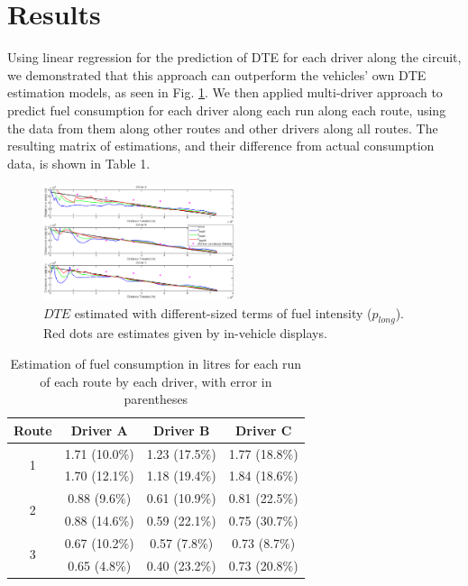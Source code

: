 \section{Results}

Using linear regression for the prediction of DTE for each driver along the circuit, we demonstrated that this approach can outperform the vehicles' own DTE estimation models, as seen in Fig. \ref{fig:dte}. 
We then applied multi-driver approach to predict fuel consumption for each driver along each run along each route, using the data from them along other routes and other drivers along all routes. The resulting matrix of estimations, and their difference from actual consumption data, is shown in Table 1.

\begin{figure}[!htb]
\centering
    \includegraphics[width=0.5\textwidth]{figs/acmdte}
\caption{\(DTE\) estimated with different-sized terms of fuel intensity (\(p_{long}\)). Red dots are estimates given by in-vehicle displays.}
 \label{fig:dte}
\end{figure}


\begin{table}[!htb]
\label{tab:est}
  \centering
  \begin{tabular}{|c|c|c|c|}
\hline
    Route & Driver A & Driver B & Driver C \\
\hline
\multirow{2}{*}{1} & 1.71 (10.0\%) & 1.23 (17.5\%) & 1.77 (18.8\%)\\
& 1.70 (12.1\%) & 1.18 (19.4\%) & 1.84 (18.6\%)\\
\hline
\multirow{2}{*}{2} & 0.88 (9.6\%) & 0.61 (10.9\%) & 0.81 (22.5\%)
\\
& 0.88 (14.6\%) & 0.59 (22.1\%) & 0.75 (30.7\%)
\\
\hline
\multirow{2}{*}{3} & 0.67 (10.2\%) & 0.57 (7.8\%) & 0.73 (8.7\%)
\\
& 0.65 (4.8\%) & 0.40 (23.2\%) & 0.73 (20.8\%)
\\
\hline
  \end{tabular}
  \caption{Estimation of fuel consumption in litres for each run of each route by each driver, with error in parentheses}
\end{table}
